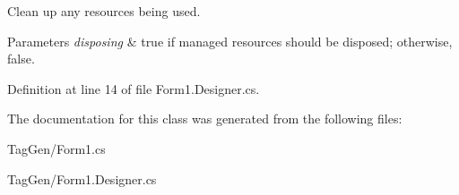 Clean up any resources being used. 


\begin{DoxyParams}{Parameters}
{\em disposing} & true if managed resources should be disposed; otherwise, false.\\
\hline
\end{DoxyParams}


Definition at line 14 of file Form1.\+Designer.\+cs.



The documentation for this class was generated from the following files\+:\begin{DoxyCompactItemize}
\item 
Tag\+Gen/Form1.\+cs\item 
Tag\+Gen/Form1.\+Designer.\+cs\end{DoxyCompactItemize}
